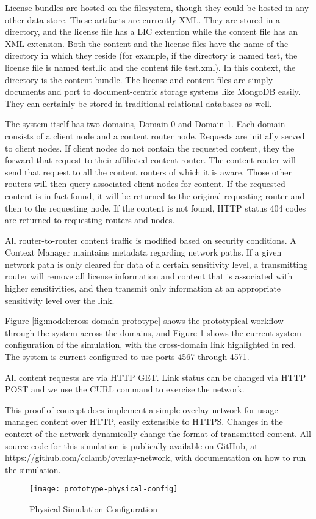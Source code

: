 License bundles are hosted on the filesystem, though they could be hosted in any other data store.  These artifacts are currently XML.  They are stored in a directory, and the license file has a LIC extention while the content file has an XML extension.  Both the content and the license files have the name of the directory in which they reside (for example, if the directory is named test, the license file is named test.lic and the content file test.xml).  In this context, the directory is the content bundle.  The license and content files are simply documents and port to document-centric storage systems like MongoDB easily.  They can certainly be stored in traditional relational databases as well.

The system itself has two domains, Domain 0 and Domain 1.  Each domain consists of a client node and a content router node.  Requests are initially served to client nodes.  If client nodes do not contain the requested content, they the forward that request to their affiliated content router.  The content router will send that request to all the content routers of which it is aware.  Those other routers will then query associated client nodes for content.  If the requested content is in fact found, it will be returned to the original requesting router and then to the requesting node.  If the content is not found, HTTP status 404 codes are returned to requesting routers and nodes.

All router-to-router content traffic is modified based on security conditions.  A Context Manager maintains metadata regarding network paths.  If a given network path is only cleared for data of a certain sensitivity level, a transmitting router will remove all license information and content that is associated with higher sensitivities, and then transmit only information at an appropriate sensitivity level over the link.

Figure \ref{fig:model:cross-domain-prototype} shows the prototypical workflow through the system across the domains, and Figure \ref{fig:model:prototype-physical-config} shows the current system configuration of the simulation, with the cross-domain link highlighted in red.  The system is current configured to use ports 4567 through 4571.

All content requests are via HTTP GET.  Link status can be changed via HTTP POST and we use the CURL command to exercise the network.

This proof-of-concept does implement a simple overlay network for usage managed content over HTTP, easily extensible to HTTPS.  Changes in the context of the network dynamically change the format of transmitted content.  All source code for this simulation is publically available on GitHub, at https://github.com/cclamb/overlay-network, with documentation on how to run the simulation.

\begin{figure}[!t]
\centering
\texttt{[image: prototype-physical-config]}
\caption{Physical Simulation Configuration}
\label{fig:model:prototype-physical-config}
\end{figure}